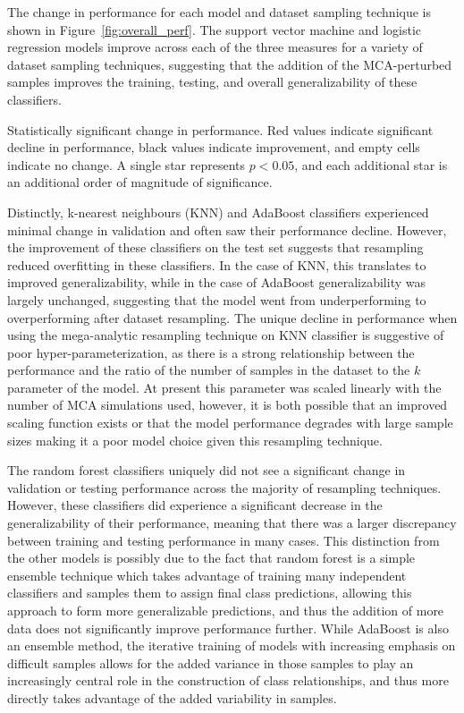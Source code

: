 \documentclass[10pt]{SelfArx} %
\begin{document}
The change in performance for each model and dataset sampling technique is shown in Figure~\ref{fig:overall_perf}. The
support vector machine and logistic regression models improve across each of the three measures for a variety of
dataset sampling techniques, suggesting that the addition of the MCA-perturbed samples improves the training, testing,
and overall generalizability of these classifiers.

\begin{table}[b!]
\centering
\caption{Statistically significant change in performance. Red values indicate significant
decline in performance, black values indicate improvement, and empty cells indicate no change. A single star
represents $p < 0.05$, and each additional star is an additional order of magnitude of significance.}
\label{tab1:perf}
\small

\end{table}

Distinctly, k-nearest neighbours (KNN) and AdaBoost classifiers experienced minimal change in validation and often saw
their performance decline. However, the improvement of these classifiers on the test set suggests that resampling
reduced overfitting in these classifiers. In the case of KNN, this translates to improved generalizability, while in
the case of AdaBoost generalizability was largely unchanged, suggesting that the model went from underperforming to
overperforming after dataset resampling. The unique decline in performance when using the mega-analytic resampling
technique on KNN classifier is suggestive of poor hyper-parameterization, as there is a strong relationship between the
performance and the ratio of the number of samples in the dataset to the $k$ parameter of the model. At present this
parameter was scaled linearly with the number of MCA simulations used, however, it is both possible that an improved
scaling function exists or that the model performance degrades with large sample sizes making it a poor model choice
given this resampling technique.

The random forest classifiers uniquely did not see a significant change in validation or testing performance across the
majority of resampling techniques. However, these classifiers did experience a significant decrease in the
generalizability of their performance, meaning that there was a larger discrepancy between training and testing
performance in many cases. This distinction from the other models is possibly due to the fact that random forest is a
simple ensemble technique which takes advantage of training many independent classifiers and samples them to assign
final class predictions, allowing this approach to form more generalizable predictions, and thus the addition of more
data does not significantly improve performance further. While AdaBoost is also an ensemble method, the iterative
training of models with increasing emphasis on difficult samples allows for the added variance in those samples to play
an increasingly central role in the construction of class relationships, and thus more directly takes advantage of the
added variability in samples.
\end{document}
